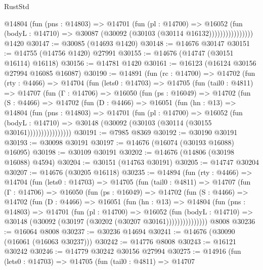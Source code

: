\begin{lexlean}{RustStd}
\begin{coremodule}
                      @14804
                        (fun (pns : @14803) =>
                        @14701
                          (fun (pl : @14700) =>
                          @16052
                            (fun (bodyL : @14710) =>
                            @30087 (@30092 (@30103 (@30114 @16132))))))))))))))))
    @1420
@30147 := @30085 (@14693 @1420)
@30148 := @14676 @30147
@30151 := @14755 (@14756 @1420) @27991
@30155 := @14676 (@14747 (@30151 @16114) @16118)
@30156 := @14781 @1420
@30161 := @16123 (@16124 @30156 @27994 @16085 @16087)
@30190 := @14891
    (fun (rc : @14700) =>
    @14702
      (fun (rty : @4466) =>
      @14704
        (fun (lets0 : @14703) =>
        @14705
          (fun (tail0 : @4811) =>
          @14707
            (fun (Γ : @14706) =>
            @16050
              (fun (ps : @16049) =>
              @14702
                (fun (S : @4466) =>
                @14702
                  (fun (D : @4466) =>
                  @16051
                    (fun (hn : @13) =>
                    @14804
                      (fun (pns : @14803) =>
                      @14701
                        (fun (pl : @14700) =>
                        @16052
                          (fun (bodyL : @14710) =>
                          @30148 (@30092 (@30103 (@30114 (@30155 @30161))))))))))))))))
@30191 := @7985 @8369
@30192 := @30190 @30191
@30193 := @30098 @30191
@30197 := @14676 (@16074 (@30193 @16088) @16095)
@30198 := @30109 @30191
@30202 := @14676 (@14806 (@30198 @16088) @4594)
@30204 := @30151 (@14763 @30191)
@30205 := @14747 @30204
@30207 := @14676 (@30205 @16118)
@30235 := @14894
    (fun (rty : @4466) =>
    @14704
      (fun (lets0 : @14703) =>
      @14705
        (fun (tail0 : @4811) =>
        @14707
          (fun (Γ : @14706) =>
          @16050
            (fun (ps : @16049) =>
            @14702
              (fun (S : @4466) =>
              @14702
                (fun (D : @4466) =>
                @16051
                  (fun (hn : @13) =>
                  @14804
                    (fun (pns : @14803) =>
                    @14701
                      (fun (pl : @14700) =>
                      @16052
                        (fun (bodyL : @14710) =>
                        @30148 (@30092 (@30197 (@30202 (@30207 @30161)))))))))))))))
    @8008
@30236 := @16064 @8008
@30237 := @30236 @14694
@30241 := @14676 (@30090 (@16061 (@16063 @30237)))
@30242 := @14776 @8008
@30243 := @16121 @30242
@30246 := @14779 @30242 @30156 @27994
@30275 := @14916
    (fun (lets0 : @14703) =>
    @14705
      (fun (tail0 : @4811) =>
      @14707

\end{coremodule}
\end{lexlean}
